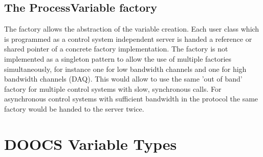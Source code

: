 \documentclass[11pt,a4paper]{scrartcl}
\begin{document}
\subsection{The ProcessVariable factory}

The factory allows the abstraction of the variable creation. Each user class which is programmed as a control system independent server is handed a reference or shared pointer of a concrete factory implementation. The factory is not implemented as a singleton pattern to allow the use of multiple factories simultaneously, for instance one for low bandwidth channels and one for high bandwidth channels (DAQ). This would allow to use the same 'out of band' factory for multiple control systems with slow, synchronous calls. For asynchronous control systems with sufficient bandwidth in the protocol the same factory would be handed to the server twice.

\appendix
\section{DOOCS Variable Types}
\end{document}
